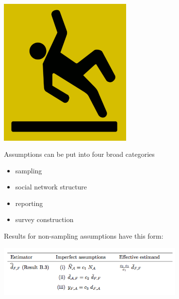 \documentclass[aspectratio=169]{beamer}
\begin{document}
\begin{frame}

\begin{center}
\includegraphics[width=0.5\textwidth]{figures/slippery-when-wet}
\end{center}

\end{frame}
\begin{frame}

Assumptions can be put into four broad categories
\begin{itemize}
\item sampling
\item social network structure
\item reporting
\item survey construction
\end{itemize}

\end{frame}
\begin{frame}

Results for non-sampling assumptions have this form:
\begin{center}
\includegraphics[width=0.7\textwidth]{figures/feehan_estimating_2014_tabd1_result1}
\end{center}

\end{frame}
\end{document}
